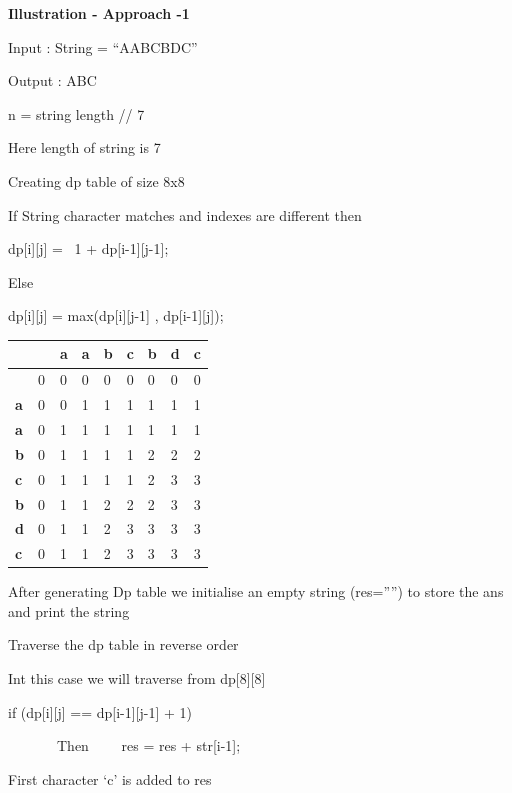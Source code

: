 \documentclass[letterpaper]{article}
\begin{document}
\begin{multicols}{2}
\bigskip

{\bfseries
Illustration - Approach -1}

Input : String = ``AABCBDC''

Output : ABC

n = string length // 7

Here length of string is 7 

Creating dp table of size 8x8

If String character matches and indexes are different then

dp[i][j] = \ 1 + dp[i-1][j-1];

Else 

dp[i][j] = max(dp[i][j-1] , dp[i-1][j]);

\begin{table}
\raggedright
\begin{tabular}{|m{0.68cm}|m{0.611cm}|m{0.68200004cm}|m{0.788cm}|m{0.68200004cm}|m{0.611cm}|m{0.53900003cm}|m{0.68200004cm}|m{0.544cm}|}

\hline
~
 &
~
 &
{\bfseries a} &
{\bfseries a} &
{\bfseries b} &
{\bfseries c} &
{\bfseries b} &
{\bfseries d} &
{\bfseries c}\\\hline
~
 &
0 &
0 &
0 &
0 &
0 &
0 &
0 &
0\\\hline
{\bfseries a} &
0 &
0 &
1 &
1 &
1 &
1 &
1 &
1\\\hline
{\bfseries a} &
0 &
1 &
1 &
1 &
1 &
1 &
1 &
1\\\hline
{\bfseries b} &
0 &
1 &
1 &
1 &
1 &
2 &
2 &
2\\\hline
{\bfseries c} &
0 &
1 &
1 &
1 &
1 &
2 &
3 &
3\\\hline
{\bfseries b} &
0 &
1 &
1 &
2 &
2 &
2 &
3 &
3\\\hline
{\bfseries d} &
0 &
1 &
1 &
2 &
3 &
3 &
3 &
3\\\hline
{\bfseries c} &
0 &
1 &
1 &
2 &
3 &
3 &
3 &
3\\\hline\end{tabular}

\end{table}
After generating Dp table we initialise an empty string (res=''{}'') to store the ans and print the string

Traverse the dp table in reverse order

Int this case we will traverse from dp[8][8] 

if (dp[i][j] == dp[i-1][j-1] + 1)

\ \ \ \ \ \ \ Then \ \ \ \ res = res + str[i-1];

First character `c' is added to res 


\end{multicols}
\end{document}
